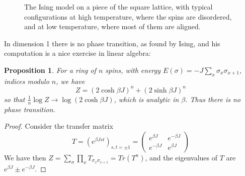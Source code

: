 \documentclass[11pt,a4paper]{article}
\newtheorem{prop}[thm]{Proposition}
\theoremstyle{remark}
\begin{document}
\begin{figure}[htb!]
\centering
{}
\caption{The Ising model on a piece of the square lattice, with typical configurations at high temperature, where the spins are disordered, and at low temperature, where most of them are aligned.}\label{fig:lattice}
\end{figure}

In dimension 1 there is no phase transition, as found by Ising, and his computation is a nice exercise in linear algebra:

\begin{samepage}
\begin{prop}\label{prop:ising1}
For a ring of $n$ spins, with energy $E(\sigma)=-J\sum_x\sigma_x\sigma_{x+1}$, indices modulo $n$, we have
\[
 Z=(2\cosh\beta J)^n+(2\sinh\beta J)^n
\]
so that $\frac{1}{n}\log Z\to\log(2\cosh\beta J)$, which is analytic in $\beta$. Thus there is no phase transition.
\end{prop}
\end{samepage}

\begin{proof}
Consider the transfer matrix
\[
 T=(e^{\beta Jst})_{s,t=\pm1}=\begin{pmatrix}e^{\beta J}&e^{-\beta J}\\e^{-\beta J}&e^{\beta J}\end{pmatrix}
\]
We have then $Z=\sum_\sigma\prod_xT_{\sigma_x\sigma_{x+1}}=Tr(T^n)$, and the eigenvalues of $T$ are $e^{\beta J}\pm e^{-\beta J}$.
\end{proof}
\end{document}
